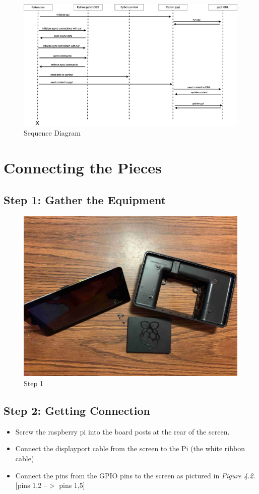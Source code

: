 \documentclass{article}
\numberwithin{figure}{section}
\begin{document}
\begin{figure}[H]
\centering
\includegraphics[width=1\columnwidth]{./diagrams/sequence/diagram_sequence.png}
\caption{Sequence Diagram}
\end{figure}





\hypertarget{connecting-the-pieces}{%
\section{Connecting the Pieces}\label{connecting-the-pieces}}

\subsection{Step 1: Gather the Equipment}

\begin{figure}[H]
\centering
\includegraphics[width=0.7\columnwidth]{./resources/comp-0.jpeg}
\caption{Step 1}
\end{figure}

\subsection{Step 2: Getting Connection}
\begin{itemize}
  \item Screw the raspberry pi into the board posts at the rear of the screen.
  \item Connect the displayport cable from the screen to the Pi (the white ribbon cable)
  \item Connect the pins from the GPIO pins to the screen as pictured in \emph{Figure 4.2}. [pins 1,2 --$>$ pins 1,5]
\end{itemize}
\end{document}
